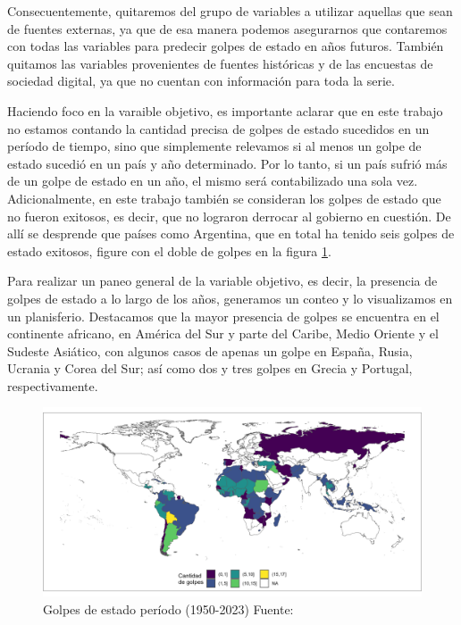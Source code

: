 \documentclass{article}
\begin{document}
Consecuentemente, quitaremos del grupo de variables a utilizar aquellas que sean de
fuentes externas, ya que de esa manera podemos asegurarnos que contaremos con todas
las variables para predecir golpes de estado en años futuros. También quitamos las
variables provenientes de fuentes históricas y de las encuestas de sociedad digital,
ya que no cuentan con información para toda la serie.

Haciendo foco en la varaible objetivo, es importante aclarar que en este trabajo no 
estamos contando la cantidad precisa
de golpes de estado sucedidos en un período de tiempo, sino que simplemente relevamos
si al menos un golpe de estado sucedió en un país y año determinado. Por lo tanto, si
un país sufrió más de un golpe de estado en un año, el mismo será contabilizado una
sola vez. Adicionalmente, en este trabajo también se consideran los golpes de estado
que no fueron exitosos, es decir, que no lograron derrocar al gobierno en cuestión. 
De allí se desprende que países como Argentina, que en total ha tenido seis golpes de 
estado exitosos, figure con el doble de golpes en la figura \ref{fig::mapa_golpes}.

Para realizar un paneo general de la variable objetivo, es decir, la presencia de
golpes de estado a lo largo de los años, generamos un conteo y lo visualizamos en un 
planisferio. Destacamos que la mayor presencia de golpes se encuentra en el 
continente africano, en América del Sur y parte del Caribe, Medio Oriente y el 
Sudeste Asiático, con algunos casos de apenas un golpe en España, Rusia, Ucrania 
y Corea del Sur; así como dos y tres golpes en Grecia y Portugal, respectivamente.

\begin{figure}[H]
  \centering  
  \includegraphics[width=1\textwidth]{2_golpes.png}
  \caption{Golpes de estado período (1950-2023) Fuente: \cite{Pow11} \label{fig::mapa_golpes}}
\end{figure}
\end{document}
